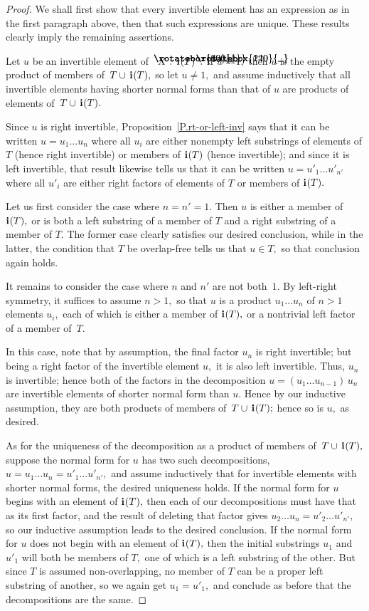 \documentclass{amsart}
\numberwithin{equation}{section}
\newcommand{\I}{\mathbf{i}\hspace{.05em}}
\newcommand{\langl}{\begin{picture}(.51em,1em)
\put(.11em,.33em){\rotatebox{60}{\line(1,0){.55em}}}
\put(.11em,.33em){\rotatebox{300}{\line(1,0){.55em}}}
\end{picture}}
\newcommand{\rangl}{\begin{picture}(.5em,1em)
\put(.09em,.33em){\rotatebox{120}{\line(1,0){.55em}}}
\put(.09em,.33em){\rotatebox{240}{\line(1,0){.55em}}}
\end{picture}}
\begin{document}
\begin{proof}
We shall first show that every invertible element
has an expression as in
the first paragraph above, then that such expressions are unique.
These results clearly imply the remaining assertions.

Let $u$ be an invertible element of $\langl X:\,\I(T)\rangl.$
If $u=1,$ then $u$ is the empty product of members of~$T\cup\,\I(T),$
so let $u\neq 1,$ and assume inductively that
all invertible elements having shorter normal forms
than that of $u$
are products of elements of~$T\cup\,\I(T).$

Since $u$ is right invertible, Proposition~\ref{P.rt-or-left-inv}
says that it can be written $u=u_1\dots u_n$ where all
$u_i$ are either nonempty left substrings of elements of $T$
(hence right invertible) or members of $\I(T)$ (hence invertible);
and since it is left invertible, that result likewise tells
us that it can be written $u=u'_1\dots u'_{n'}$ where all
$u'_i$ are either right factors of elements of $T$
or members of $\I(T).$

Let us first consider the case where $n=n'=1.$
Then $u$ is either a member of $\I(T),$
or is both a left substring of a member
of $T$ and a right substring of a member of $T.$
The former case clearly satisfies our desired conclusion,
while in the latter, the condition that $T$ be overlap-free
tells us that $u\in T,$ so that conclusion again holds.

It remains to consider the case where $n$ and $n'$ are not both~$1.$
By left-right symmetry, it suffices to assume $n>1,$
so that $u$ is a product $u_1\dots u_n$ of $n>1$ elements
$u_i,$ each of which is either a member of $\I(T),$
or a nontrivial left factor of a member of~$T.$

In this case, note that by assumption, the final
factor $u_n$ is right invertible; but being a right factor
of the invertible element $u,$ it is also left invertible.
Thus, $u_n$ is invertible; hence both of the factors
in the decomposition $u=(u_1\dots u_{n-1})\,u_n$ are
invertible elements of shorter normal form than $u.$
Hence by our inductive assumption, they are both products
of members of~$T\cup\,\I(T);$ hence so is $u,$ as desired.

As for the uniqueness of the decomposition
as a product of members of~$T\cup\,\I(T),$
suppose the normal form for $u$ has two such decompositions,
$u=u_1\dots u_n =u'_1\dots u'_{n'},$ and
assume inductively that for invertible
elements with shorter normal forms, the desired uniqueness holds.
If the normal form for $u$ begins with an element of $\I(T),$
then each of our decompositions must have
that as its first factor, and the result of deleting that factor
gives $u_2\dots u_n =u'_2\dots u'_{n'},$ so
our inductive assumption leads to the desired conclusion.
If the normal form for $u$ does not begin with an element
of $\I(T),$ then the initial substrings $u_1$ and $u'_1$
will both be members of $T,$ one of which is a left substring
of the other.
But since $T$ is assumed non-overlapping,
no member of $T$ can be a proper left substring of another, so
we again get $u_1=u'_1,$ and conclude as before that the
decompositions are the same.
\end{proof}
\end{document}
